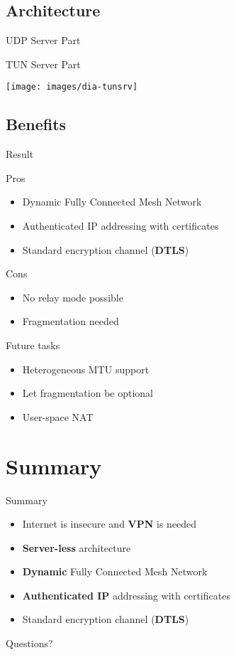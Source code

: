 \documentclass{beamer}
\newcommand*{\comparativeframe}[5]{
\begin{frame}{#1}
	#2
	\begin{exampleblock}{Pros}
		\begin{itemize}
		#3
		\end{itemize}
	\end{exampleblock}
	\begin{alertblock}{Cons}
		\begin{itemize}
		#4
		\end{itemize}
	\end{alertblock}
	#5
\end{frame}
}
\begin{document}
\subsection{Architecture}
\begin{frame}{UDP Server Part}
	\begin{center}
	\end{center}
\end{frame}
\begin{frame}{TUN Server Part}
	\begin{center}
	\texttt{[image: images/dia-tunsrv]}
	\end{center}
\end{frame}
\subsection{Benefits}
\comparativeframe{Result}{}
{%
\item Dynamic Fully Connected Mesh Network
\item Authenticated IP addressing with certificates
\item Standard encryption channel (\textbf{DTLS})
}{%
\item No relay mode possible
\item Fragmentation needed
}{
\begin{block}{Future tasks}\begin{itemize}
\item Heterogeneous MTU support
\item Let fragmentation be optional
\item User-space NAT
\end{itemize}\end{block}
}

\section*{Summary}
\begin{frame}{Summary}
	\begin{itemize}
	\item Internet is \alert{insecure} and \textbf{VPN} is needed
	\item \textbf{Server-less} architecture
	\item \textbf{Dynamic} Fully Connected Mesh Network
	\item \textbf{Authenticated IP} addressing with certificates
	\item Standard encryption channel (\textbf{DTLS})
	\end{itemize}
\end{frame}

\begin{frame}
\begin{center}
Questions?
\end{center}
\end{frame}
\end{document}

